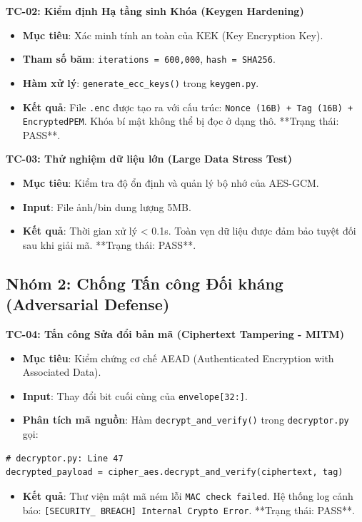 \documentclass[11pt,a4paper]{article}
\begin{document}
\textbf{TC-02: Kiểm định Hạ tầng sinh Khóa (Keygen Hardening)}
\begin{itemize}[noitemsep]
    \item \textbf{Mục tiêu}: Xác minh tính an toàn của KEK (Key Encryption Key).
    \item \textbf{Tham số băm}: \texttt{iterations = 600,000}, \texttt{hash = SHA256}.
    \item \textbf{Hàm xử lý}: \texttt{generate\_ecc\_keys()} trong \texttt{keygen.py}.
    \item \textbf{Kết quả}: File \texttt{.enc} được tạo ra với cấu trúc: \texttt{Nonce (16B) + Tag (16B) + EncryptedPEM}. Khóa bí mật không thể bị đọc ở dạng thô. **Trạng thái: PASS**.
\end{itemize}

\textbf{TC-03: Thử nghiệm dữ liệu lớn (Large Data Stress Test)}
\begin{itemize}[noitemsep]
    \item \textbf{Mục tiêu}: Kiểm tra độ ổn định và quản lý bộ nhớ của AES-GCM.
    \item \textbf{Input}: File ảnh/bin dung lượng 5MB.
    \item \textbf{Kết quả}: Thời gian xử lý < 0.1s. Toàn vẹn dữ liệu được đảm bảo tuyệt đối sau khi giải mã. **Trạng thái: PASS**.
\end{itemize}

\subsection{Nhóm 2: Chống Tấn công Đối kháng (Adversarial Defense)}

\textbf{TC-04: Tấn công Sửa đổi bản mã (Ciphertext Tampering - MITM)}
\begin{itemize}[noitemsep]
    \item \textbf{Mục tiêu}: Kiểm chứng cơ chế AEAD (Authenticated Encryption with Associated Data).
    \item \textbf{Input}: Thay đổi bit cuối cùng của \texttt{envelope[32:]}.
    \item \textbf{Phân tích mã nguồn}: Hàm \texttt{decrypt\_and\_verify()} trong \texttt{decryptor.py} gọi:
\end{itemize}
\begin{lstlisting}
# decryptor.py: Line 47
decrypted_payload = cipher_aes.decrypt_and_verify(ciphertext, tag)
\end{lstlisting}
\begin{itemize}
    \item \textbf{Kết quả}: Thư viện mật mã ném lỗi \texttt{MAC check failed}. Hệ thống log cảnh báo: \texttt{[SECURITY\_\ BREACH] Internal Crypto Error}. **Trạng thái: PASS**.
\end{itemize}
\end{document}
